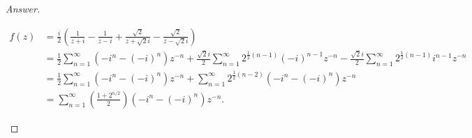\documentclass[12pt]{article}
\newcommand\paren[1]{\left( #1 \right)}
\theoremstyle{definition}
\begin{document}
\begin{proof}[Answer]
\begin{enumerate}[(i)]
\begin{align*}
            f(z) & = \frac{i}{2} \paren{ \frac{1}{z + i} - \frac{1}{z - i} + \frac{\sqrt{2}}{z + \sqrt{2} i} - \frac{\sqrt{2}}{z - \sqrt{2} i} } \\
            & = \frac{1}{2} \sum\limits_{n = 1}^{\infty} \paren{ -i^n - (-i)^n } z^{-n} + \frac{\sqrt{2}i}{2} \sum\limits_{n = 1}^{\infty} 2^{ \frac{1}{2}(n-1) } (-i)^{n-1} z^{-n} - \frac{\sqrt{2}i}{2} \sum\limits_{n = 1}^{\infty} 2^{ \frac{1}{2}(n-1) } i^{n-1} z^{-n} \\
            & = \frac{1}{2} \sum\limits_{n = 1}^{\infty} \paren{ -i^n - (-i)^n } z^{-n} + \sum\limits_{n = 1}^{\infty} 2^{\frac{1}{2}(n-2)} \paren{ -i^n - (-i)^n } z^{-n} \\
            & = \boxed{ \sum\limits_{n = 1}^{\infty} \paren{ \frac{ 1 + 2^{n/2} }{2} } \paren{ -i^n - (-i)^n } z^{-n}. }
        \end{align*}
    \end{enumerate}
\end{proof}
\end{document}
